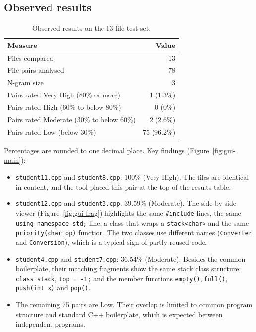 \documentclass[11pt,a4paper]{report}
\newcommand{\cc}[1]{\texttt{#1}}
\begin{document}
\subsection{Observed results}
\begin{table}[htbp]
\centering
\begin{tabular}{@{}l r@{}}
\toprule
Measure & Value \\
\midrule
Files compared & 13 \\
File pairs analysed & 78 \\
N-gram size & 3 \\
Pairs rated Very High (80\% or more) & 1 (1.3\%) \\
Pairs rated High (60\% to below 80\%) & 0 (0\%) \\
Pairs rated Moderate (30\% to below 60\%) & 2 (2.6\%) \\
Pairs rated Low (below 30\%) & 75 (96.2\%) \\
\bottomrule
\end{tabular}
\caption{Observed results on the 13-file test set.}
\label{tab:results}
\end{table}

Percentages are rounded to one decimal place. Key findings (Figure~\ref{fig:gui-main}):
\begin{itemize}[nosep]
  \item \cc{student11.cpp} and \cc{student8.cpp}: 100\% (Very High). The files are identical
        in content, and the tool placed this pair at the top of the results table.
  \item \cc{student12.cpp} and \cc{student3.cpp}: 39.59\% (Moderate). The side-by-side
        viewer (Figure~\ref{fig:gui-frag}) highlights the same \cc{\#include} lines, the same
        \cc{using namespace std;} line, a class that wraps a \cc{stack<char>} and the same
        \cc{priority(char op)} function. The two classes use different names
        (\cc{Converter} and \cc{Conversion}), which is a typical sign of partly reused code.
  \item \cc{student4.cpp} and \cc{student7.cpp}: 36.54\% (Moderate). Besides the common
        boilerplate, their matching fragments show the same stack class structure:
        \cc{class stack}, \cc{top = -1;} and the member functions \cc{empty()},
        \cc{full()}, \cc{push(int x)} and \cc{pop()}.
  \item The remaining 75 pairs are Low. Their overlap is limited to common program structure
        and standard C++ boilerplate, which is expected between independent programs.
\end{itemize}
\end{document}
